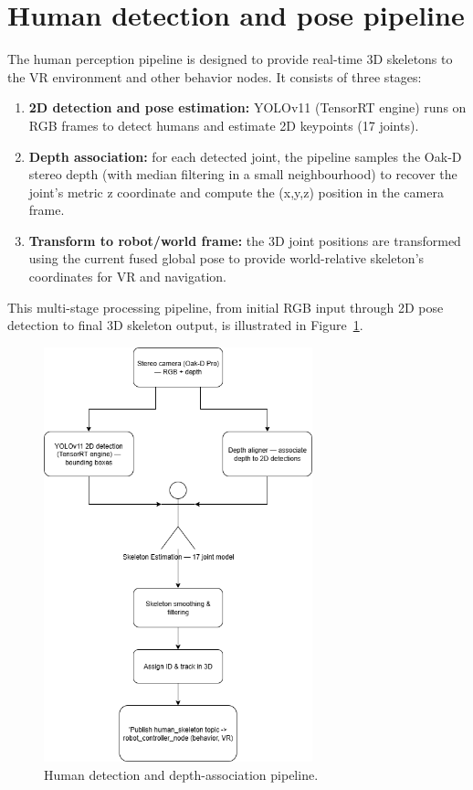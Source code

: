 \section{Human detection and pose pipeline}

The human perception pipeline is designed to provide real-time 3D skeletons to the VR environment and other behavior nodes. It consists of three stages:

\begin{enumerate}
	\item \textbf{2D detection and pose estimation:} YOLOv11 (TensorRT engine) runs on RGB frames to detect humans and estimate 2D keypoints (17 joints).
	\item \textbf{Depth association:} for each detected joint, the pipeline samples the Oak‑D stereo depth (with median filtering in a small neighbourhood) to recover the joint's metric z coordinate and compute the (x,y,z) position in the camera frame.
	\item \textbf{Transform to robot/world frame:} the 3D joint positions are transformed using the current fused global pose to provide world-relative skeleton's coordinates for VR and navigation.
\end{enumerate}

This multi-stage processing pipeline, from initial RGB input through 2D pose detection to final 3D skeleton output, is illustrated in Figure~\ref{fig-human-pipeline}.

\begin{figure}[H]
	\centering
	\includegraphics[height=12cm]{Images/human_pipeline.png}
	\caption{Human detection and depth-association pipeline.}\label{fig-human-pipeline}
\end{figure}

